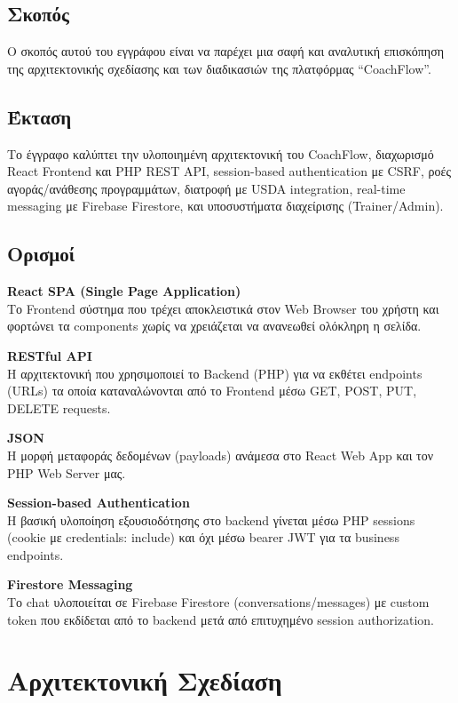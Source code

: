 \documentclass[12pt,a4paper]{report}
\begin{document}
\subsection{Σκοπός}
Ο σκοπός αυτού του εγγράφου είναι να παρέχει μια σαφή και αναλυτική επισκόπηση της αρχιτεκτονικής σχεδίασης και των διαδικασιών της πλατφόρμας “CoachFlow”.

\subsection{Έκταση}
Το έγγραφο καλύπτει την υλοποιημένη αρχιτεκτονική του CoachFlow, διαχωρισμό React Frontend και PHP REST API, session-based authentication με CSRF, ροές αγοράς/ανάθεσης προγραμμάτων, διατροφή με USDA integration, real-time messaging με Firebase Firestore, και υποσυστήματα διαχείρισης (Trainer/Admin).

\subsection{Ορισμοί}
\textbf{React SPA (Single Page Application)} \\
Το Frontend σύστημα που τρέχει αποκλειστικά στον Web Browser του χρήστη και φορτώνει τα components χωρίς να χρειάζεται να ανανεωθεί ολόκληρη η σελίδα.

\textbf{RESTful API} \\
Η αρχιτεκτονική που χρησιμοποιεί το Backend (PHP) για να εκθέτει endpoints (\textenglish{URLs}) τα οποία καταναλώνονται από το Frontend μέσω \textenglish{GET, POST, PUT, DELETE requests}.

\textbf{JSON} \\
Η μορφή μεταφοράς δεδομένων (payloads) ανάμεσα στο React Web App και τον PHP Web Server μας. 

\textbf{Session-based Authentication} \\
Η βασική υλοποίηση εξουσιοδότησης στο backend γίνεται μέσω PHP sessions (cookie με \textenglish{credentials: include}) και όχι μέσω bearer JWT για τα business endpoints.

\textbf{Firestore Messaging} \\
Το chat υλοποιείται σε Firebase Firestore (conversations/messages) με custom token που εκδίδεται από το backend μετά από επιτυχημένο session authorization.

\newpage

\section{Αρχιτεκτονική Σχεδίαση}
\end{document}
